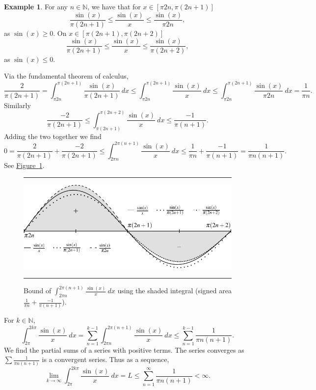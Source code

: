 \documentclass[12pt]{book}
\newenvironment{myfigureht}{%
\begin{figure}[h!t]
\noindent\rule{\textwidth}{0.4pt}\vspace{12pt}\par\centering}%
{\par\noindent\rule{\textwidth}{0.4pt}
\end{figure}}
\newcommand{\N}{{\mathbb{N}}}
\theoremstyle{plain}
\theoremstyle{remark}
\theoremstyle{definition}
\theoremstyle{exercise}
\theoremstyle{example}
\newtheorem{example}[thm]{Example}
\newcommand{\figureref}[1]{\hyperref[#1]{Figure~\ref*{#1}}}
\begin{document}
\begin{example}
For any $n \in \N$, we have that for $x \in [\pi 2n, \pi (2n+1)]$
\begin{equation*}
\frac{\sin(x)}{\pi (2n+1)}
\leq
\frac{\sin(x)}{x}
\leq
\frac{\sin(x)}{\pi 2n} ,
\end{equation*}
as $\sin(x) \geq 0$.  On $x \in [\pi (2n+1), \pi (2n+2)]$
\begin{equation*}
\frac{\sin(x)}{\pi (2n+1)}
\leq
\frac{\sin(x)}{x}
\leq
\frac{\sin(x)}{\pi (2n+2)} ,
\end{equation*}
as $\sin(x) \leq 0$.

Via the fundamental theorem of calculus,
\begin{equation*}
\frac{2}{\pi (2n+1)}
=
\int_{\pi 2n}^{\pi (2n+1)}
\frac{\sin(x)}{\pi (2n+1)}
~dx
\leq
\int_{\pi 2n}^{\pi (2n+1)}
\frac{\sin(x)}{x}
~dx
\leq
\int_{\pi 2n}^{\pi (2n+1)}
\frac{\sin(x)}{\pi 2n}
~dx
=
\frac{1}{\pi n} .
\end{equation*}
Similarly
\begin{equation*}
\frac{-2}{\pi (2n+1)}
\leq
\int_{\pi (2n+1)}^{\pi (2n+2)}
\frac{\sin(x)}{x}
~dx
\leq
\frac{-1}{\pi (n+1)} .
\end{equation*}
Adding the two together we find
\begin{equation*}
0
=
\frac{2}{\pi (2n+1)}
+
\frac{-2}{\pi (2n+1)}
\leq
\int_{2\pi n}^{2\pi (n+1)}
\frac{\sin(x)}{x}
~dx
\leq
\frac{1}{\pi n} 
+
\frac{-1}{\pi (n+1)} 
=
\frac{1}{\pi n(n+1)} .
\end{equation*}
See \figureref{fig:sincbound}.
\begin{myfigureht}
\includegraphics{figures/sincbound}
\caption{Bound of $\int_{2\pi n}^{2\pi (n+1)} \frac{\sin(x)}{x} ~dx$ using
the shaded integral (signed area
$\frac{1}{\pi n} 
+
\frac{-1}{\pi (n+1)}$).\label{fig:sincbound}}
\end{myfigureht}

For $k \in \N$, 
\begin{equation*}
\int_{2\pi}^{2k\pi} \frac{\sin(x)}{x} ~dx
=
\sum_{n=1}^{k-1}
\int_{2\pi n}^{2\pi (n+1)} \frac{\sin(x)}{x} ~dx 
\leq
\sum_{n=1}^{k-1}
\frac{1}{\pi n(n+1)} .
\end{equation*}
We find the partial sums of a series with positive terms.
The series
converges as
$\sum \frac{1}{\pi n (n+1)}$ is a convergent series.  Thus
as a sequence,
\begin{equation*}
\lim_{k\to \infty} \int_{2\pi}^{2k\pi} \frac{\sin(x)}{x} ~dx
=L \leq
\sum_{n=1}^{\infty}
\frac{1}{\pi n(n+1)} < \infty .
\end{equation*}


\end{example}
\end{document}
